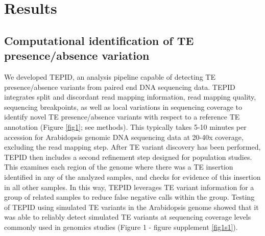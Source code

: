 \documentclass[12pt]{article}
\begin{document}
\section{Results}

\subsection{Computational identification of TE presence/absence variation}

We developed TEPID, an analysis pipeline capable of detecting TE
presence/absence variants from paired end DNA sequencing data. TEPID
integrates split and discordant read mapping information, read mapping
quality, sequencing breakpoints, as well as local variations in
sequencing coverage to identify novel TE presence/absence variants with
respect to a reference TE annotation (Figure \ref{fig1}; see methods). This
typically takes 5-10 minutes per accession for Arabidopsis genomic DNA
sequencing data at 20-40x coverage, excluding the read mapping step.
After TE variant discovery has been performed, TEPID then includes a
second refinement step designed for population studies. This examines
each region of the genome where there was a TE insertion identified in
any of the analyzed samples, and checks for evidence of this insertion
in all other samples. In this way, TEPID leverages TE variant
information for a group of related samples to reduce false negative
calls within the group. Testing of TEPID using simulated TE variants in
the Arabidopsis genome showed that it was able to reliably detect
simulated TE variants at sequencing coverage levels commonly used in
genomics studies (Figure 1 - figure supplement \ref{fig1s1}).
\end{document}
